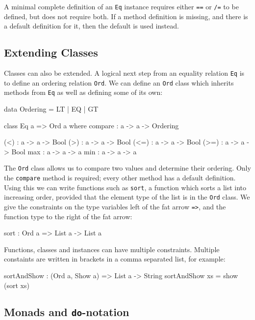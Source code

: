 \noindent
A minimal complete definition of an \texttt{Eq} instance requires either \texttt{==} or \texttt{/=} to be defined, but does not require both.
If a method definition is missing, and there is a default definition for it, then the default is used instead.

\subsection{Extending Classes}

Classes can also be extended.
A logical next step from an equality relation \texttt{Eq} is to define an ordering relation \texttt{Ord}.
We can define an \texttt{Ord} class which inherits methods from \texttt{Eq} as well as defining some of its own:

\begin{code}
data Ordering = LT | EQ | GT
\end{code} 

\begin{code}
class Eq a => Ord a where
    compare : a -> a -> Ordering

    (<) : a -> a -> Bool
    (>) : a -> a -> Bool
    (<=) : a -> a -> Bool
    (>=) : a -> a -> Bool
    max : a -> a -> a
    min : a -> a -> a
\end{code}

\noindent
The \texttt{Ord} class allows us to compare two values and determine their ordering. 
Only the \texttt{compare} method is required; every other method has a default definition.
Using this we can write functions such as \texttt{sort}, a function which sorts a list into increasing order, provided that the element type of the list is in the \texttt{Ord} class.
We give the constraints on the type variables left of the fat arrow \texttt{=>}, and the function type to the right of the fat arrow:

\begin{code}
sort : Ord a => List a -> List a
\end{code}

\noindent
Functions, classes and instances can have multiple constraints.
Multiple constaints are written in brackets in a comma separated list, for example:

\begin{code}
sortAndShow : (Ord a, Show a) => List a -> String
sortAndShow xs = show (sort xs)
\end{code}

\subsection{Monads and \texttt{do}-notation}

